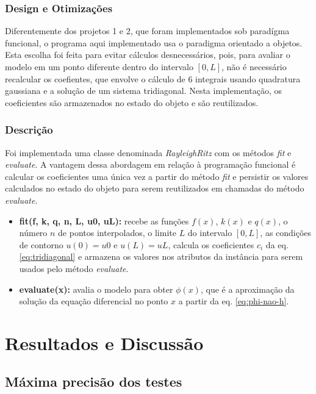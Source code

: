 \documentclass[a4,12pt]{horizon-theme}
\begin{document}
\subsubsection{Design e Otimizações}
\label{sec:design}
Diferentemente dos projetos 1 e 2, que foram implementados sob paradígma funcional, o programa aqui implementado usa o paradigma orientado a objetos. Esta escolha foi feita para evitar cálculos desnecessários, pois, para avaliar o modelo em um ponto diferente dentro do intervalo $[0, L]$, não é necessário recalcular os coefientes, que envolve o cálculo de 6 integrais usando quadratura gaussiana e a solução de um sistema tridiagonal. Nesta implementação, os coeficientes são armazenados no estado do objeto e são reutilizados.

\subsubsection{Descrição}
\label{sec:descricao}
Foi implementada uma classe denominada \emph{RayleighRitz} com os métodos \emph{fit} e \emph{evaluate}. A vantagem dessa abordagem em relação à programação funcional é calcular os coeficientes uma única vez a partir do método \emph{fit} e persistir os valores calculados no estado do objeto para serem reutilizados em chamadas do método \emph{evaluate}.

\begin{itemize}
  \item \textbf{fit(f, k, q, n, L, u0, uL):} recebe as funções $f(x)$, $k(x)$ e $q(x)$, o número $n$ de pontos interpolados, o limite $L$ do intervalo $[0, L]$, as condições de contorno $u(0) = u0$ e $u(L) = uL$, calcula os coeficientes $c_i$ da eq. \eqref{eq:tridiagonal} e armazena os valores nos atributos da instância para serem usados pelo método \emph{evaluate}.
        
  \item \textbf{evaluate(x):} avalia o modelo para obter $\phi(x)$, que é a aproximação da solução da equação diferencial no ponto $x$ a partir da eq. \eqref{eq:phi-nao-h}.
\end{itemize}



\section{Resultados e Discussão}
\label{sec:resultados}

\subsection{Máxima precisão dos testes}
\label{sec:precisao}
\end{document}
